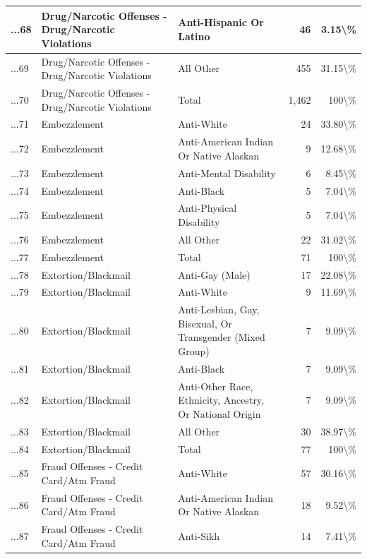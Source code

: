 \documentclass[
]{krantz}
\begin{document}
\begin{longtable}[t]{l|l|l|r|r}
\hline
...68 & Drug/Narcotic Offenses - Drug/Narcotic Violations & Anti-Hispanic Or Latino & 46 & 3.15\textbackslash{}\%\\
\hline
...69 & Drug/Narcotic Offenses - Drug/Narcotic Violations & All Other & 455 & 31.15\textbackslash{}\%\\
\hline
...70 & Drug/Narcotic Offenses - Drug/Narcotic Violations & Total & 1,462 & 100\textbackslash{}\%\\
\hline
...71 & Embezzlement & Anti-White & 24 & 33.80\textbackslash{}\%\\
\hline
...72 & Embezzlement & Anti-American Indian Or Native Alaskan & 9 & 12.68\textbackslash{}\%\\
\hline
...73 & Embezzlement & Anti-Mental Disability & 6 & 8.45\textbackslash{}\%\\
\hline
...74 & Embezzlement & Anti-Black & 5 & 7.04\textbackslash{}\%\\
\hline
...75 & Embezzlement & Anti-Physical Disability & 5 & 7.04\textbackslash{}\%\\
\hline
...76 & Embezzlement & All Other & 22 & 31.02\textbackslash{}\%\\
\hline
...77 & Embezzlement & Total & 71 & 100\textbackslash{}\%\\
\hline
...78 & Extortion/Blackmail & Anti-Gay (Male) & 17 & 22.08\textbackslash{}\%\\
\hline
...79 & Extortion/Blackmail & Anti-White & 9 & 11.69\textbackslash{}\%\\
\hline
...80 & Extortion/Blackmail & Anti-Lesbian, Gay, Bisexual, Or Transgender (Mixed Group) & 7 & 9.09\textbackslash{}\%\\
\hline
...81 & Extortion/Blackmail & Anti-Black & 7 & 9.09\textbackslash{}\%\\
\hline
...82 & Extortion/Blackmail & Anti-Other Race, Ethnicity, Ancestry, Or National Origin & 7 & 9.09\textbackslash{}\%\\
\hline
...83 & Extortion/Blackmail & All Other & 30 & 38.97\textbackslash{}\%\\
\hline
...84 & Extortion/Blackmail & Total & 77 & 100\textbackslash{}\%\\
\hline
...85 & Fraud Offenses - Credit Card/Atm Fraud & Anti-White & 57 & 30.16\textbackslash{}\%\\
\hline
...86 & Fraud Offenses - Credit Card/Atm Fraud & Anti-American Indian Or Native Alaskan & 18 & 9.52\textbackslash{}\%\\
\hline
...87 & Fraud Offenses - Credit Card/Atm Fraud & Anti-Sikh & 14 & 7.41\textbackslash{}\%\\

\end{longtable}
\end{document}
